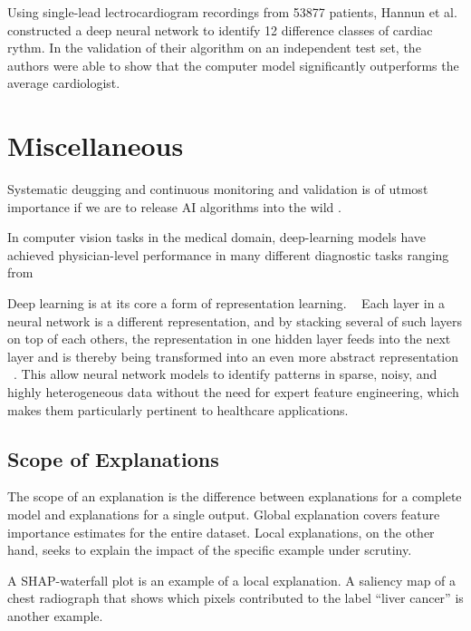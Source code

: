 Using single-lead lectrocardiogram recordings from \num{53877} patients,
Hannun et al.\autocite{hannunCardiologistlevel2019}
constructed a deep neural network
to identify 12 difference classes of cardiac rythm.
In the validation of their algorithm on an independent test set,
the authors were able to show that the computer model
significantly outperforms the average cardiologist. 



\section{Miscellaneous}

Systematic deugging and continuous monitoring and validation 
is of utmost importance if we are to release AI algorithms into the wild%
\autocite{topolHighperformance2019}.

In computer vision tasks in the medical domain,
deep-learning models have achieved physician-level performance
in many different diagnostic tasks
ranging from


Deep learning is at its core a form of representation learning.
~\autocite{estevaGuide2019}
Each layer in a neural network is a different representation,
and by stacking several of such layers on top of each others,
the representation in one hidden layer
feeds into the next layer and
is thereby being transformed into an even more abstract representation%
~\autocite{estevaGuide2019}.
This allow neural network models to identify patterns in sparse, noisy,
and highly heterogeneous data without the need for expert feature engineering,
which makes them particularly pertinent to healthcare applications.%
~



\subsection{Scope of Explanations}

The scope of an explanation is the difference between
explanations for a complete model and
explanations for a single output.
Global explanation covers feature importance estimates 
for the entire dataset.
Local explanations, on the other hand, seeks to explain
the impact of the specific example under scrutiny.

A SHAP-waterfall plot is an example of a local explanation.
A saliency map of a chest radiograph that shows
which pixels contributed to the label \enquote{liver cancer}
is another example.


